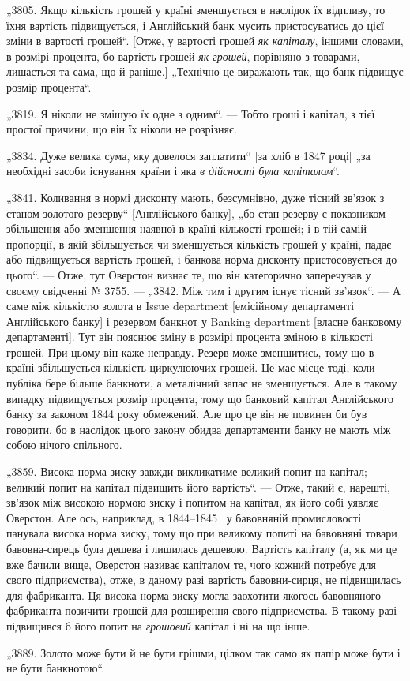 
„3805. Якщо кількість грошей у країні зменшується в наслідок
їх відпливу, то їхня вартість підвищується, і Англійський банк
мусить пристосуватись до цієї зміни в вартості грошей“. [Отже, у вартості грошей \emph{як капіталу}, іншими
словами, в розмірі процента, бо вартість грошей \emph{як грошей}, порівняно з товарами,
лишається та сама, що й раніше.] „Технічно це виражають так,
що банк підвищує розмір процента“.

„3819. Я ніколи не змішую їх одне з одним“. — Тобто гроші
і капітал, з тієї простої причини, що він їх ніколи не розрізняє.

„3834. Дуже велика сума, яку довелося заплатити“ [за хліб
в 1847 році] „за необхідні засоби існування країни і яка \emph{в дійсності була капіталом}“.

„3841. Коливання в нормі дисконту мають, безсумнівно, дуже
тісний зв’язок з станом золотого резерву“ [Англійського
банку], „бо стан резерву є показником збільшення або зменшення
наявної в країні кількості грошей; і в тій самій пропорції, в якій
збільшується чи зменшується кількість грошей у країні, падає або
підвищується вартість грошей, і банкова норма дисконту пристосовується до цього“. — Отже, тут
Оверстон визнає те, що він
категорично заперечував у своєму свідченні № 3755. — „3842. Між
тим і другим існує тісний зв’язок“. — А саме між кількістю золота
в Issue department [емісійному департаменті Англійського банку]
і резервом банкнот у Banking department [власне банковому департаменті]. Тут він пояснює зміну в
розмірі процента зміною в кількості грошей. При цьому він каже неправду. Резерв може зменшитись,
тому що в країні збільшується кількість циркулюючих грошей.
Це має місце тоді, коли публіка бере більше банкноти, а металічний запас не зменшується. Але в
такому випадку підвищується
розмір процента, тому що банковий капітал Англійського банку
за законом 1844 року обмежений. Але про це він не повинен
би був говорити, бо в наслідок цього закону обидва департаменти банку не мають між собою нічого
спільного.

„3859. Висока норма зиску завжди викликатиме великий попит
на капітал; великий попит на капітал підвищить його вартість“. — Отже, такий є, нарешті, зв’язок між
високою нормою
зиску і попитом на капітал, як його собі уявляє Оверстон. Але
ось, наприклад, в 1844--1845~ у бавовняній промисловості
панувала висока норма зиску, тому що при великому попиті на
бавовняні товари бавовна-сирець була дешева і лишилась дешевою. Вартість капіталу (а, як ми це вже
бачили вище, Оверстон називає капіталом те, чого кожний потребує для свого
підприємства), отже, в даному разі вартість бавовни-сирця, не
підвищилась для фабриканта. Ця висока норма зиску могла
заохотити якогось бавовняного фабриканта позичити грошей для
розширення свого підприємства. В такому разі підвищився б його
попит на \emph{грошовий} капітал і ні на що інше.

„3889. Золото може бути й не бути грішми, цілком так само
як папір може бути і не бути банкнотою“.
